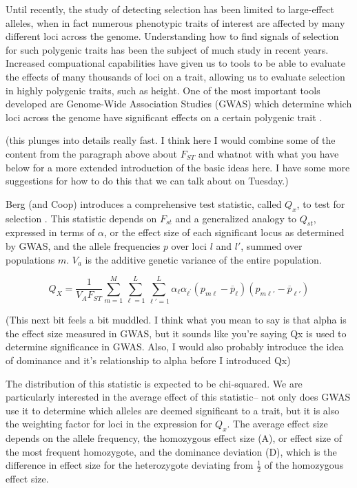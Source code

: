 \documentclass[a4paper,11pt]{article}
\newcommand{\jb}[1]{{\color{blue} (#1)} }
\begin{document}
Until recently, the study of detecting selection has been limited to
large-effect alleles, when in fact numerous phenotypic traits of interest
are affected by many different loci across the genome. Understanding
how to find signals of selection for such polygenic traits has been
the subject of much study in recent years. Increased compuational
capabilities have given us to tools to be able to evaluate the effects
of many thousands of loci on a trait, allowing us to evaluate
selection in highly polygenic traits, such as height. One of the most
important tools developed are Genome-Wide Association Studies (GWAS)
which determine which loci across the genome have significant effects
on a certain polygenic trait \cite{gwasoverview}. 

\jb{this plunges into details really fast. I think here I would combine some of the content from the paragraph above about $F_{ST}$ and whatnot with what you have below for a more extended introduction of the basic ideas here. I have some more suggestions for how to do this that we can talk about on Tuesday.}

Berg \jb{and Coop} introduces a comprehensive test statistic, called $Q_x$, to test
for selection \cite{berg}. This statistic depends on $F_{st}$ and
a generalized analogy to $Q_{st}$, expressed in terms of $\alpha$, or
the effect size of each significant locus as determined by GWAS, and
the allele frequencies $p$ over loci $l$ and $l'$, summed over
populations $m$. $V_a$ is the additive genetic variance of the entire population.

\begin{equation} \label{Qxraw}
  Q_X = \frac{1}{V_A F_{ST}} \sum_{m=1}^M \sum_{\ell=1}^L \sum_{\ell\prime=1}^L \alpha_{\ell} \alpha_{\ell^{\prime}}\left(p_{m\ell} - \overline{p}_\ell \right)\left(p_{m \ell\prime} - \overline{p}_{\ell\prime}\right)
\end{equation}

\jb{This next bit feels a bit muddled. I think what you mean to say is that alpha is the effect size measured in GWAS, but it sounds like you're saying Qx is used to determine significance in GWAS. Also, I would also probably introduce the idea of dominance and it's relationship to alpha before I introduced Qx}

The distribution of this statistic is expected to be chi-squared. We are particularly interested in the average effect of this
statistic-- not only does GWAS use it to determine which alleles are deemed
significant to a trait, but it is also the weighting factor for loci in the
expression for $Q_x$. The average effect size depends on the allele
frequency, the homozygous effect size (A), or effect size of the most frequent homozygote, and the
dominance deviation (D), which is the difference in effect size for the heterozygote
deviating from $\frac{1}{2}$ of the homozygous effect size.
\end{document}
